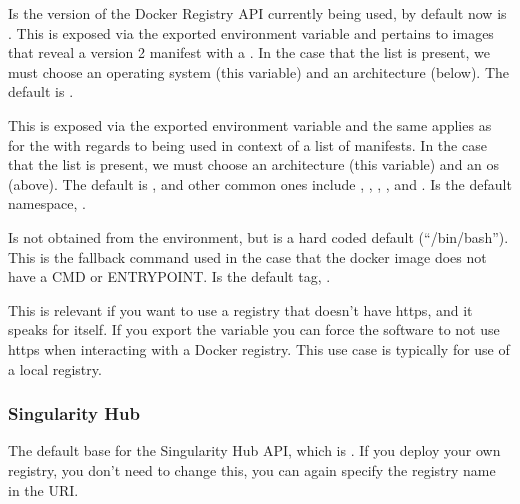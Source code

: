 \documentclass[letterpaper,10pt,english]{sphinxmanual}
\begin{document}
 Is the version of the Docker Registry API
currently being used, by default now is .
 This is exposed via the exported environment variable 
and pertains to images that reveal a version 2 manifest with a
. In the case that the list is present, we must choose
an operating system (this variable) and an architecture (below). The
default is .

 This is exposed via the exported environment
variable 
and the same applies as for the  with regards to being used in context
of a list of manifests. In the case that the list is present, we must
choose an architecture (this variable) and an os (above). The default
is , and other common ones include , , , , and .
 Is the default namespace, .

 Is not obtained from the environment, but is a
hard coded default (“/bin/bash”). This is the fallback command used in
the case that the docker image does not have a CMD or ENTRYPOINT.
 Is the default tag, .

 This is relevant if you want to use a
registry that doesn’t have https, and it speaks for itself. If you
export the variable  you can force the software to not use https when
interacting with a Docker registry. This use case is typically for use
of a local registry.


\subsubsection{Singularity Hub}
\label{\detokenize{build_environment:singularity-hub}}
 The default base for the Singularity Hub API,
which is . If you deploy your own registry, you don’t need
to change this, you can again specify the registry name in the URI.
\end{document}
